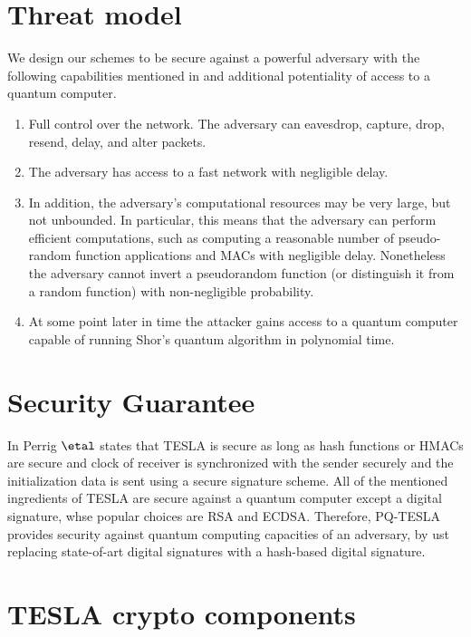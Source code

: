 \section{Threat model }
We design our schemes to be secure against a powerful adversary with the following capabilities mentioned in \cite{perrig2000efficient} and additional potentiality of access to a quantum computer.
\begin{enumerate}
    \item Full control over the network. The adversary can eavesdrop, capture, drop, resend, delay, and alter packets.
    \item The adversary has access to a fast network with negligible delay.
    \item In addition, the adversary’s computational resources may be very large, but not unbounded. In particular, this means that the adversary can perform efficient computations, such as computing a reasonable number of pseudo-random function applications and MACs with negligible delay. Nonetheless the adversary cannot invert a pseudorandom function (or distinguish it from a random function) with non-negligible probability.
    \item At some point later in time the attacker gains access to a quantum computer capable of running Shor’s quantum algorithm in polynomial time.
\end{enumerate}


\section{Security Guarantee }
In \cite{perrig2000efficient} Perrig $\etal$  states that TESLA is secure as long as hash functions or HMACs are secure and clock of receiver is synchronized with the sender securely and the initialization data is sent using a secure signature scheme. All of the mentioned ingredients of TESLA are secure against a quantum computer except a digital signature, whse popular choices are RSA and ECDSA. Therefore, PQ-TESLA provides security against quantum computing capacities of an adversary, by ust replacing state-of-art digital signatures with a hash-based digital signature.


\section{TESLA crypto components }



